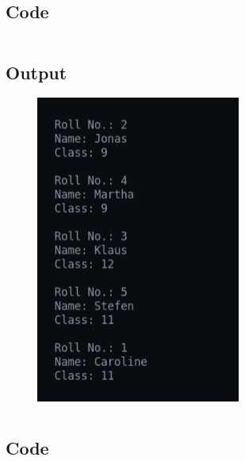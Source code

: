 \documentclass[12pt]{article}
\begin{document}
\subsection{Code}
\inputminted{c}{q12.c}
\subsection{Output}
\begin{figure}[h]
    \centering
    \includegraphics[width=0.6\textwidth]{12.png}
\end{figure}

\newpage
\section{}
\subsection{Code}
\inputminted{c}{q13.c}
\newpage
\end{document}
